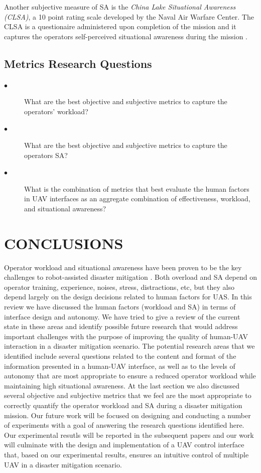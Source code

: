 \documentclass[12pt, letterpaper, oneside]{article}
\begin{document}
Another subjective measure of SA is the \emph{China Lake Situational Awareness (CLSA)}, a 10 point rating scale developed by the Naval Air Warfare Center. The CLSA is a questionaire administered upon completion of the mission and it captures the operators self-perceived situational awareness during the mission \cite{37}.

\subsection{Metrics Research Questions}

\begin{description}
	\item[$\bullet$]
	What are the best objective and subjective metrics to capture the operators' workload? 
	\item[$\bullet$]
	What are the best objective and subjective metrics to capture the operators SA? 
	\item[$\bullet$]
	What is the combination of metrics that best evaluate the human factors in UAV interfaces as an aggregate combination of effectiveness, workload, and situational awareness? 
	
\end{description}

\section{CONCLUSIONS}
Operator workload and situational awareness have been proven to be the key challenges to robot-assisted disaster mitigation \cite{18}. Both overload and SA depend on operator training, experience, noises, stress, distractions, etc, but they also depend largely on the design decisions related to human factors for UAS. In this review we have discussed the human factors (workload and SA) in terms of interface design and autonomy. We have tried to give a review of the current state in these areas and identify possible future research that would address important challenges with the purpose of improving the quality of human-UAV interaction in a disaster mitigation scenario. The potential research areas that we identified include several questions related to the content and format of the information presented in a human-UAV interface, as well as to the levels of autonomy that are most appropriate to ensure a reduced operator workload while maintaining high situational awareness. At the last section we also discussed several objective and subjective metrics that we feel are the most appropriate to correctly quantify the operator workload and SA during a disaster mitigation mission. Our future work will be focused on designing and conducting a number of experiments with a goal of answering the research questions identified here. Our experimental resutls will be reported in the subsequent papers and our work will culminate with the design and implementation of a UAV control interface that, based on our experimental results, ensures an intuitive control of multiple UAV in a disaster mitigation scenario.   

\medskip
\pagebreak



\end{document}
